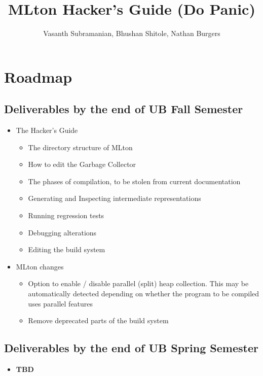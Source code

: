 \documentclass{article}
\title{MLton Hacker's Guide (Do Panic)}
\author{Vasanth Subramanian, Bhushan Shitole, Nathan Burgers}
\date{}
\begin{document}
\maketitle
\tableofcontents
\clearpage

\section{Roadmap}
\subsection{Deliverables by the end of UB Fall Semester}
\begin{itemize}
\item The Hacker's Guide
  \begin{itemize}
  \item The directory structure of MLton
  \item How to edit the Garbage Collector
  \item The phases of compilation, to be stolen from current documentation
  \item Generating and Inspecting intermediate representations
  \item Running regression tests
  \item Debugging alterations
  \item Editing the build system
  \end{itemize}
\item MLton changes
  \begin{itemize}
  \item Option to enable / disable parallel (split) heap collection. This may be automatically detected depending on whether the program to be compiled uses parallel features
  \item Remove deprecated parts of the build system
  \end{itemize}
\end{itemize}
\subsection{Deliverables by the end of UB Spring Semester}
\begin{itemize}
  \item \textbf{TBD}
\end{itemize}
\end{document}
